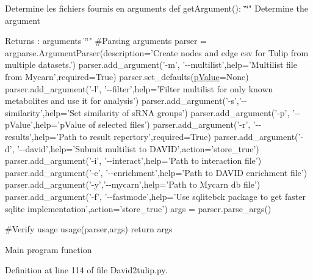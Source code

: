 \-Determine les fichiers fournis en arguments def get\-Argument()\-: \char`\"{}\char`\"{}" \-Determine the argument \begin{DoxyReturn}{\-Returns}
\-: arguments \char`\"{}\char`\"{}" \#\-Parsing arguments parser = argparse.\-Argument\-Parser(description='\-Create nodes and edge csv for \-Tulip from multiple datasets.') parser.\-add\-\_\-argument('-\/m', '-\/-\/multilist',help='\-Multilist file from \-Mycarn',required=\-True) parser.\-set\-\_\-defaults(\hyperlink{namespaceirna_1_1David2tulip_1_1pValue}{p\-Value}=\-None) parser.\-add\-\_\-argument('-\/l', '-\/-\/filter',help='\-Filter multilist for only known metabolites and use it for analysis') parser.\-add\-\_\-argument('-\/s','-\/-\/similarity',help='\-Set similarity of s\-R\-N\-A groups') parser.\-add\-\_\-argument('-\/p', '-\/-\/p\-Value',help='p\-Value of selected files') parser.\-add\-\_\-argument('-\/r', '-\/-\/results',help='\-Path to result repertory',required=\-True) parser.\-add\-\_\-argument('-\/d', '-\/-\/david',help='\-Submit multilist to \-D\-A\-V\-I\-D',action='store\-\_\-true') parser.\-add\-\_\-argument('-\/i', '-\/-\/interact',help='\-Path to interaction file') parser.\-add\-\_\-argument('-\/e', '-\/-\/enrichment',help='\-Path to \-D\-A\-V\-I\-D enrichment file') parser.\-add\-\_\-argument('-\/y','-\/-\/mycarn',help='\-Path to \-Mycarn db file') parser.\-add\-\_\-argument('-\/f', '-\/-\/fastmode',help='\-Use sqlitebck package to get faster sqlite implementation',action='store\-\_\-true') args = parser.\-parse\-\_\-args()
\end{DoxyReturn}
\#\-Verify usage usage(parser,args) return args

\-Main program function 

\-Definition at line 114 of file \-David2tulip.\-py.

